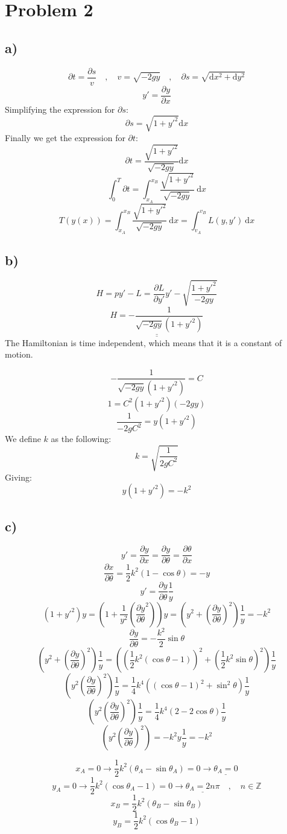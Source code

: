 \documentclass{article}
\begin{document}
\section*{Problem 2}
\subsection*{a)}
\[
∂t = \frac{∂s}{v} \quad , \quad  v = \sqrt{-2gy} \quad , \quad  ∂s = \sqrt{\mathrm{d}x^2 + \mathrm{d}y^2}
\]
\[
y' = \frac{∂y}{∂x} 
\]
Simplifying the expression for $∂s$:
\[
∂s = \sqrt{1 + y'^2} \mathrm{d}x
\]
Finally we get the expression for $∂t$:
\[
∂t = \frac{\sqrt{1 + y'^2}}{\sqrt{-2gy}} \mathrm{d}x
\]
\[
∫_{0}^{T} ∂t = ∫_{x_{A}}^{x_{B}} \frac{\sqrt{1 + y'^2}}{\sqrt{-2gy}}  \ \mathrm{d}x
\]
\[
T (y(x)) = ∫_{x_{A}}^{x_{B}} \frac{\sqrt{1 + y'^2}}{\sqrt{-2gy}}  \ \mathrm{d}x = ∫_{v_{A}}^{v_{B}} L(y,y') \ \mathrm{d}x
\]

\subsection*{b)}
\[
H = p y' - L = \frac{∂ L}{∂ y'} y' - \sqrt{\frac{1 + y'^2}{-2gy}}
\]
\[
\underline{\underline{H = - \frac{1}{\sqrt{-2gy}(1 + y'^2)}}}
\]
The Hamiltonian is time independent, which means that it is a constant of motion. 

\[
- \frac{1}{\sqrt{-2gy}(1 + y'^2)} = C
\]
\[
 1 = C^2 (1 + y'^2) (-2gy)
\]
\[
\frac{1}{-2gC^2} = y(1 + y'^2)
\]
We define $k$ as the following:
\[
k = \sqrt{\frac{1}{2gC^2}}
\]
Giving:
\[
y(1 + y'^2) = -k^2
\]

\subsection*{c)}
\[
y' = \frac{∂y}{∂x} = \frac{∂y}{∂θ} = \frac{∂ θ }{∂ x} 
\]
\[
\frac{∂ x}{∂ θ} = \frac{1}{2} k^2 (1 - \cos θ) = -y
\]
\[
y' = \frac{∂ y}{∂ θ} \frac{1}{y}
\]
\[
(1+y'^2)y = \left(1 + \frac{1}{y^2} \left(\frac{∂ y}{∂ θ}^2\right)\right)y = \left(y^2 + \left(\frac{∂ y}{∂ θ}\right)^2\right) \frac{1}{y} = -k^2
\]
\[
\frac{∂ y}{∂ θ} = - \frac{k^2}{2} \sin θ
\]
\[
\left(y^2 + \left(\frac{∂ y}{∂ θ}\right)^2\right) \frac{1}{y} = \left(\left(\frac{1}{2} k^2 (\cos θ - 1)\right)^2 + \left(\frac{1}{2} k^2 \sin θ\right)^2\right) \frac{1}{y}
\]
\[
\left(y^2 \left(\frac{∂ y}{∂ θ}\right)^2\right) \frac{1}{y} = \frac{1}{4}k^{4} \left(\left(\cos θ - 1\right)^2 + \sin^2θ\right) \frac{1}{y}
\]
\[
\left(y^2 \left(\frac{∂ y}{∂ θ}\right)^2\right) \frac{1}{y} = \frac{1}{4}k^{4} \left(2 - 2\cos θ\right) \frac{1}{y}
\]
\[
\left(y^2 \left(\frac{∂ y}{∂ θ}\right)^2\right) = -k^2y \frac{1}{y} = -k^2
\]

\[
x_{A} = 0 → \frac{1}{2} k^2 (θ_{A} - \sin θ_{A}) = 0 → \underline{θ_{A} = 0}
\]
\[
y_{A} = 0 → \frac{1}{2} k^2 (\cos θ_{A} - 1) = 0 → \underline{θ_{A} = 2n\pi} \quad , \quad n \in \mathbb{Z}
\]
\[
x_{B} = \frac{1}{2} k^2 (θ_{B} - \sin θ_{B}) 
\]
\[
y_{B} = \frac{1}{2} k^2 (\cos θ_{B} - 1)
\]
\end{document}
